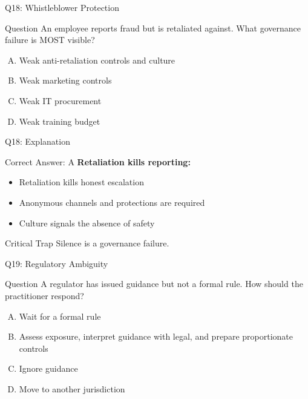 \documentclass{beamer}
\begin{document}
	\begin{frame}{Q18: Whistleblower Protection}
		\begin{block}{Question}
			An employee reports fraud but is retaliated against. What governance failure is MOST visible?
		\end{block}
		\begin{enumerate}[(A)]
			\item Weak anti-retaliation controls and culture
			\item Weak marketing controls
			\item Weak IT procurement
			\item Weak training budget
		\end{enumerate}
	\end{frame}
	
	\begin{frame}{Q18: Explanation}
		\begin{block}{Correct Answer: A}
			\textbf{Retaliation kills reporting:}
			\begin{itemize}
				\item Retaliation kills honest escalation
				\item Anonymous channels and protections are required
				\item Culture signals the absence of safety
			\end{itemize}
		\end{block}
		\begin{alertblock}{Critical Trap}
			Silence is a governance failure.
		\end{alertblock}
	\end{frame}
	
	\begin{frame}{Q19: Regulatory Ambiguity}
		\begin{block}{Question}
			A regulator has issued guidance but not a formal rule. How should the practitioner respond?
		\end{block}
		\begin{enumerate}[(A)]
			\item Wait for a formal rule
			\item Assess exposure, interpret guidance with legal, and prepare proportionate controls
			\item Ignore guidance
			\item Move to another jurisdiction
		\end{enumerate}
	\end{frame}
	
\end{document}
